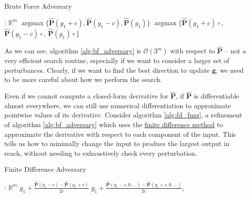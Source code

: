 \documentclass[12pt,initial,twoside,maitrise]{dms}
\numberwithin{equation}{section}
\numberwithin{table}{chapter}
\numberwithin{figure}{chapter}
\begin{document}
\begin{algorithm}[H]
\caption{Brute Force Adversary}
\label{alg:bf_adversary}
\begin{algorithmic}[1]
: $\mathbb{R}^m$
 
\State \Return $\operatorname{argmax}\{\mathbf{\hat P}(g_1 + c), \mathbf{\hat P}(g_1 - c), \mathbf{\hat P}(g_1)\}$
\Else {}
\State \Return $\operatorname{argmax}\{\mathbf{\hat P}(g_1 + c) \circ$,\newline
\hspace*{10em} $\mathbf{\hat P}(g_1 - c)\circ$,\newline
\hspace*{10em} $\mathbf{\hat P}(g_1)\circ$$\}$
\EndIf
\EndProcedure
\end{algorithmic}
\end{algorithm}

As we can see, algorithm \autoref{alg:bf_adversary} is $\mathcal{O}(3^m)$ with respect to $\mathbf{\hat P}$ -- not a very efficient search routine, especially if we want to consider a larger set of perturbances. Clearly, if we want to find the best direction to update $\mathbf g$, we need to be more careful about how we perform the search.

Even if we cannot compute a closed-form derivative for $\mathbf{\hat P}$, if $\mathbf{\hat P}$ is differentiable almost everywhere, we can still use numerical differentiation to approximate pointwise values of its derivative. Consider algorithm \autoref{alg:fd_fuzz}, a refinement of algorithm \autoref{alg:bf_adversary} which uses the \hyperref[sec:fdm]{finite difference method} to approximate the derivative with respect to each component of the input. This tells us how to minimally change the input to produce the largest output in reach, without needing to exhaustively check every perturbation.

\begin{algorithm}[H]
\caption{Finite Difference Adversary}
\label{alg:fd_fuzz}
\begin{algorithmic}[1]
: $\mathbb{R}^m$
 
\State \Return $g_1 + \frac{\mathbf{\hat P}(g_1 - c) - \mathbf{\hat P}(g_1 + c)}{2c}$
\Else {}
\State \Return $g_1 + \frac{\mathbf{\hat P}(g_1 - c, 0, \ldots) - \mathbf{\hat P}(g_1 + c, 0, \ldots)}{2c}$, 
\EndIf
\EndProcedure
\end{algorithmic}
\end{algorithm}
\end{document}
